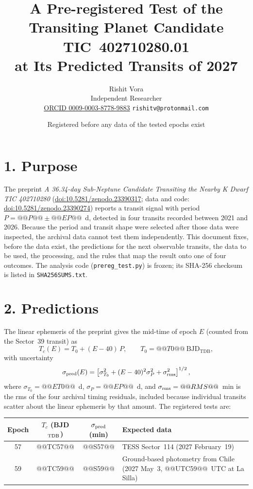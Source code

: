 \documentclass[11pt]{article}
\title{A Pre-registered Test of the Transiting Planet Candidate TIC~402710280.01\\ at Its Predicted Transits of 2027}
\author{Rishit Vora\\ \small Independent Researcher \\ \small \href{https://orcid.org/0009-0003-8778-9883}{ORCID 0009-0003-8778-9883} \quad \texttt{rishitv@protonmail.com}}
\date{Registered before any data of the tested epochs exist}
\begin{document}
\maketitle

\section*{1. Purpose}
The preprint \emph{A 36.34-day Sub-Neptune Candidate Transiting the Nearby K Dwarf TIC 402710280} (\href{https://doi.org/10.5281/zenodo.23390317}{doi:10.5281/zenodo.23390317}; data and code: \href{https://doi.org/10.5281/zenodo.23390274}{doi:10.5281/zenodo.23390274}) reports a transit signal with period $P = @@P@@ \pm @@EP@@$~d, detected in four transits recorded between 2021 and 2026. Because the period and transit shape were selected after those data were inspected, the archival data cannot test them independently. This document fixes, before the data exist, the predictions for the next observable transits, the data to be used, the processing, and the rules that map the result onto one of four outcomes. The analysis code (\texttt{prereg\_test.py}) is frozen; its SHA-256 checksum is listed in \texttt{SHA256SUMS.txt}.

\section*{2. Predictions}
The linear ephemeris of the preprint gives the mid-time of epoch $E$ (counted from the Sector~39 transit) as
\begin{equation*}
T_c(E) = T_0 + (E - 40)\,P, \qquad T_0 = @@T0@@~\mathrm{BJD_{TDB}},
\end{equation*}
with uncertainty
\begin{equation*}
\sigma_{\rm pred}(E) = \left[\sigma_{T_0}^2 + (E-40)^2\sigma_P^2 + \sigma_{\rm rms}^2\right]^{1/2},
\end{equation*}
where $\sigma_{T_0} = @@ET0@@$~d, $\sigma_P = @@EP@@$~d, and $\sigma_{\rm rms} = @@RMS@@$~min is the rms of the four archival timing residuals, included because individual transits scatter about the linear ephemeris by that amount. The registered tests are:

\begin{center}
\begin{tabular}{cccl}
\toprule
Epoch & $T_c$ (BJD$_{\rm TDB}$) & $\sigma_{\rm pred}$ (min) & Expected data \\
\midrule
57 & @@TC57@@ & @@S57@@ & TESS Sector~114 (2027 February~19) \\
59 & @@TC59@@ & @@S59@@ & Ground-based photometry from Chile (2027 May~3, @@UTC59@@~UTC at La Silla) \\
\bottomrule
\end{tabular}
\end{center}
\end{document}

